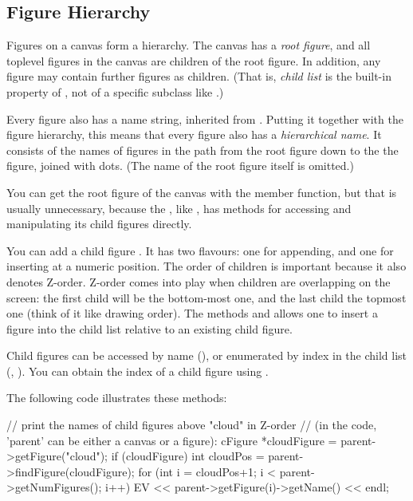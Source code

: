 \subsection{Figure Hierarchy}

Figures on a canvas form a hierarchy. The canvas has a \textit{root
figure}, and all toplevel figures in the canvas are children of the root
figure. In addition, any figure may contain further figures as children.
(That is, \textit{child list} is the built-in property of ,
not of a specific subclass like .)

Every figure also has a name string, inherited from .
Putting it together with the figure hierarchy, this means that every figure
also has a \textit{hierarchical name}. It consists of the names of figures
in the path from the root figure down to the the figure, joined with dots.
(The name of the root figure itself is omitted.)

You can get the root figure of the canvas with the 
member function, but that is usually unnecessary, because the
, like , has methods for accessing and
manipulating its child figures directly.

You can add a child figure . It has two flavours: one
for appending, and one for inserting at a numeric position. The order of
children is important because it also denotes Z-order. Z-order comes into
play when children are overlapping on the screen: the first child will be
the bottom-most one, and the last child the topmost one (think of it like
drawing order). The methods  and
 allows one to insert a figure into the child list
relative to an existing child figure.

Child figures can be accessed by name (), or
enumerated by index in the child list (,
). You can obtain the index of a child figure using
.

The following code illustrates these methods:

\begin{cpp}
// print the names of child figures above "cloud" in Z-order
// (in the code, 'parent' can be either a canvas or a figure):
cFigure *cloudFigure = parent->getFigure("cloud");
if (cloudFigure) {
    int cloudPos = parent->findFigure(cloudFigure);
    for (int i = cloudPos+1; i < parent->getNumFigures(); i++)
        EV << parent->getFigure(i)->getName() << endl;
}
\end{cpp}

